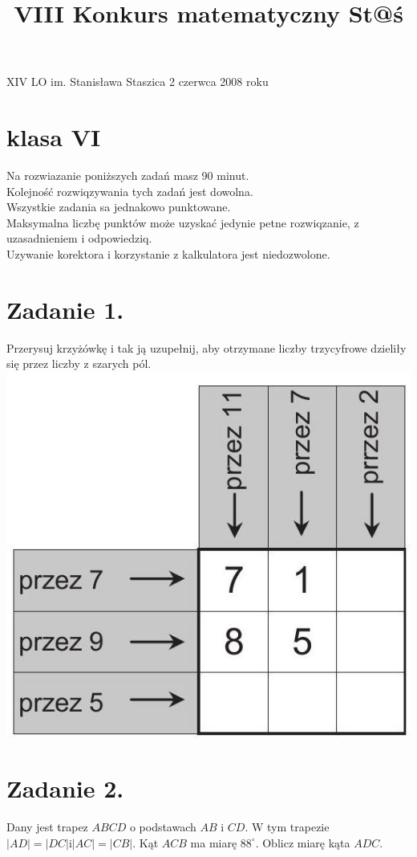 \documentclass[10pt]{article}
\title{VIII Konkurs matematyczny St@ś }
\author{}
\date{}
\begin{document}
\maketitle
XIV LO im. Stanisława Staszica 2 czerwca 2008 roku

\section*{klasa VI}
Na rozwiazanie poniższych zadań masz 90 minut.\\
Kolejność rozwiqzywania tych zadań jest dowolna.\\
Wszystkie zadania sa jednakowo punktowane.\\
Maksymalna liczbę punktów może uzyskać jedynie petne rozwiqzanie, z uzasadnieniem i odpowiedziq.\\
Uzywanie korektora i korzystanie z kalkulatora jest niedozwolone.

\section*{Zadanie 1.}
Przerysuj krzyżówkę i tak ją uzupełnij, aby otrzymane liczby trzycyfrowe dzieliły się przez liczby z szarych pól.\\
\includegraphics[max width=\textwidth, center]{2024_11_21_f8e9b6ddbb018da21a54g-1(1)}

\section*{Zadanie 2.}
Dany jest trapez \(A B C D\) o podstawach \(A B\) i \(C D\). W tym trapezie \(|A D|=|D C| \mathrm{i}|A C|=|C B|\). Kąt \(A C B\) ma miarę \(88^{\circ}\). Oblicz miarę kąta \(A D C\).
\end{document}
